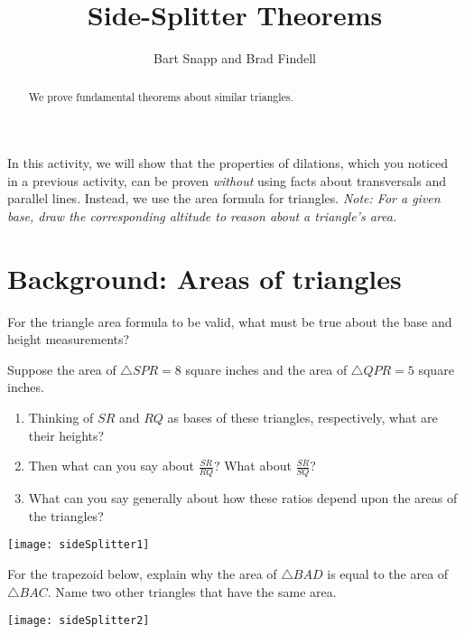 \documentclass[nooutcomes]{ximera}
\title{Side-Splitter Theorems}
\author{Bart Snapp and Brad Findell}
\begin{document}
\begin{abstract}
  We prove fundamental theorems about similar triangles.
\end{abstract}
\maketitle

In this activity, we will show that the properties of dilations, which you noticed in a previous activity, can be proven \emph{without} using facts about transversals and parallel lines.  Instead, we use the area formula for triangles.  \emph{Note: For a given base, draw the corresponding altitude to reason about a triangle's area.}

\section*{Background: Areas of triangles}
\begin{question}
For the triangle area formula to be valid, what must be true about the base and height measurements?
\vfill
\end{question}

\begin{problem}
Suppose the area of $\triangle SPR = 8$ square inches and the area of $\triangle QPR = 5$ square inches.  
\begin{enumerate}
\item Thinking of $SR$ and $RQ$ as bases of these triangles, respectively, what are their heights?  \item Then what can you say about $\frac{SR}{RQ}$?  What about $\frac{SR}{SQ}$?  
\item What can you say generally about how these ratios depend upon the areas of the triangles?  
\end{enumerate}
\begin{image}
\texttt{[image: sideSplitter1]}
\end{image}
\vfill
\end{problem}

\newpage
\begin{problem}
For the trapezoid below, explain why the area of $\triangle BAD$ is equal to the area of $\triangle BAC$.  Name two other triangles that have the same area.
\begin{image}
\texttt{[image: sideSplitter2]}
\end{image}
\vfill
\end{problem}
\end{document}
